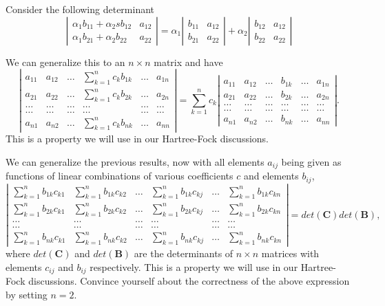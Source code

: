 \documentclass[%
oneside,                 %
final,                   %
10pt]{article}
\begin{document}
Consider the following determinant
\[
\left| \begin{array}{cc} \alpha_1b_{11}+\alpha_2sb_{12}& a_{12}\\
                         \alpha_1b_{21}+\alpha_2b_{22}&a_{22}\end{array} \right|=\alpha_1\left|\begin{array}{cc} b_{11}& a_{12}\\
                         b_{21}&a_{22}\end{array} \right|+\alpha_2\left| \begin{array}{cc} b_{12}& a_{12}\\b_{22}&a_{22}\end{array} \right|
\]

We can generalize this to  an $n\times n$ matrix and have 
\[
\left| \begin{array}{cccccc} a_{11}& a_{12} & \dots & \sum_{k=1}^n c_k b_{1k} &\dots & a_{1n}\\
a_{21}& a_{22} & \dots & \sum_{k=1}^n c_k b_{2k} &\dots & a_{2n}\\
\dots & \dots & \dots & \dots & \dots & \dots \\
\dots & \dots & \dots & \dots & \dots & \dots \\
a_{n1}& a_{n2} & \dots & \sum_{k=1}^n c_k b_{nk} &\dots & a_{nn}\end{array} \right|=
\sum_{k=1}^n c_k\left| \begin{array}{cccccc} a_{11}& a_{12} & \dots &  b_{1k} &\dots & a_{1n}\\
a_{21}& a_{22} & \dots &  b_{2k} &\dots & a_{2n}\\
\dots & \dots & \dots & \dots & \dots & \dots\\
\dots & \dots & \dots & \dots & \dots & \dots\\
a_{n1}& a_{n2} & \dots &  b_{nk} &\dots & a_{nn}\end{array} \right| .
\]
This is a property we will use in our Hartree-Fock discussions. 

We can generalize the previous results, now 
with all elements $a_{ij}$  being given as functions of 
linear combinations  of various coefficients $c$ and elements $b_{ij}$,
\[
\left| \begin{array}{cccccc} \sum_{k=1}^n b_{1k}c_{k1}& \sum_{k=1}^n b_{1k}c_{k2} & \dots & \sum_{k=1}^n b_{1k}c_{kj}  &\dots & \sum_{k=1}^n b_{1k}c_{kn}\\
\sum_{k=1}^n b_{2k}c_{k1}& \sum_{k=1}^n b_{2k}c_{k2} & \dots & \sum_{k=1}^n b_{2k}c_{kj} &\dots & \sum_{k=1}^n b_{2k}c_{kn}\\
\dots & \dots & \dots & \dots & \dots & \dots \\
\dots & \dots & \dots & \dots & \dots &\dots \\
\sum_{k=1}^n b_{nk}c_{k1}& \sum_{k=1}^n b_{nk}c_{k2} & \dots & \sum_{k=1}^n b_{nk}c_{kj} &\dots & \sum_{k=1}^n b_{nk}c_{kn}\end{array} \right|=det(\mathbf{C})det(\mathbf{B}),
\]
where $det(\mathbf{C})$ and $det(\mathbf{B})$ are the determinants of $n\times n$ matrices
with elements $c_{ij}$ and $b_{ij}$ respectively.  
This is a property we will use in our Hartree-Fock discussions. Convince yourself about the correctness of the above expression by setting $n=2$. 
\end{document}
